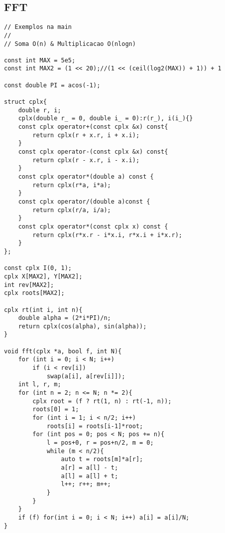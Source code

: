 \documentclass[12pt, a4paper, twoside]{article}
\begin{document}
\subsection{FFT}
\begin{lstlisting}
// Exemplos na main
//
// Soma O(n) & Multiplicacao O(nlogn)

const int MAX = 5e5;
const int MAX2 = (1 << 20);//(1 << (ceil(log2(MAX)) + 1)) + 1

const double PI = acos(-1);

struct cplx{
	double r, i;
	cplx(double r_ = 0, double i_ = 0):r(r_), i(i_){}
	const cplx operator+(const cplx &x) const{
		return cplx(r + x.r, i + x.i);
	}
	const cplx operator-(const cplx &x) const{
		return cplx(r - x.r, i - x.i);
	}
	const cplx operator*(double a) const {
		return cplx(r*a, i*a);
	}
	const cplx operator/(double a)const {
		return cplx(r/a, i/a);
	}
	const cplx operator*(const cplx x) const {
		return cplx(r*x.r - i*x.i, r*x.i + i*x.r);
	}
};

const cplx I(0, 1);
cplx X[MAX2], Y[MAX2];
int rev[MAX2];
cplx roots[MAX2];

cplx rt(int i, int n){
	double alpha = (2*i*PI)/n;
	return cplx(cos(alpha), sin(alpha));
}

void fft(cplx *a, bool f, int N){
	for (int i = 0; i < N; i++)
		if (i < rev[i])
			swap(a[i], a[rev[i]]);
	int l, r, m;
	for (int n = 2; n <= N; n *= 2){
		cplx root = (f ? rt(1, n) : rt(-1, n));
		roots[0] = 1;
		for (int i = 1; i < n/2; i++)
			roots[i] = roots[i-1]*root;
		for (int pos = 0; pos < N; pos += n){
			l = pos+0, r = pos+n/2, m = 0;
			while (m < n/2){
				auto t = roots[m]*a[r];
				a[r] = a[l] - t;
				a[l] = a[l] + t;
				l++; r++; m++;
			}
		}
	}
	if (f) for(int i = 0; i < N; i++) a[i] = a[i]/N;
}



\end{lstlisting}
\end{document}
